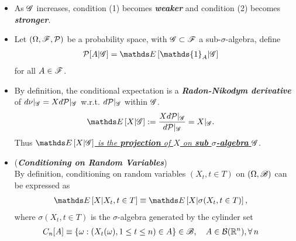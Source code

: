 \documentclass[11pt]{article}
\begin{document}
\begin{itemize}
\item \begin{remark}
As ${\mathscr G}$ increases, condition (1) becomes \emph{\textbf{weaker}} and condition (2) becomes \emph{\textbf{stronger}}.
\end{remark}

\item \begin{remark}
Let $(\Omega, {\mathscr F}, {\mathcal P})$ be a probability space, with  ${\mathscr G} \subset {\mathscr F}$ a sub-$\sigma$-algebra, define
\begin{align*}
\cP[A | \srG] &= \E{}{\mathds{1}_{A}| \srG}
\end{align*} for all $A\in {\mathscr F}$.
\end{remark}

\item \begin{remark}
By definition, the conditional expectation is a \emph{\textbf{Radon-Nikodym derivative}} of $d\nu|_{{\mathscr G}} = X d{\mathcal P}|_{{\mathscr G}}$ w.r.t. $d{\mathcal P}|_{{\mathscr G}}$ within ${\mathscr G}$.
\begin{align*}
\E{}{X| \srG}&:=  \frac{Xd\cP|_{\srG}}{d\cP|_{\srG}} = X|_{\srG}.
\end{align*} Thus \underline{\emph{$\E{}{X| \srG}$ is the \textbf{projection} of $X$ on \textbf{sub $\sigma$-algebra} ${\mathscr G}$}}.
\end{remark}

\item \begin{remark} (\emph{\textbf{Conditioning on Random Variables}})\\
By definition, conditioning on random variables $(X_{t}, t\in T)$ on $(\Omega, {\mathscr B})$ can be expressed as 
\begin{align*}
\E{}{X| X_{t}, t\in T} &\equiv \E{}{X| \sigma(X_{t}, t\in T)}, 
\end{align*}
where $\sigma(X_{t}, t\in T)$ is the $\sigma$-algebra generated by the cylinder set
\begin{align*}
C_{n}[A]&\equiv \left\{\omega: (X_{t}(\omega), 1\le t\le n) \in A  \right\} \in {\mathscr B}, \quad A\in {\mathcal B}({\mathbb R}^{n}), \forall \, n
\end{align*}
\end{remark}


\end{itemize}
\end{document}
